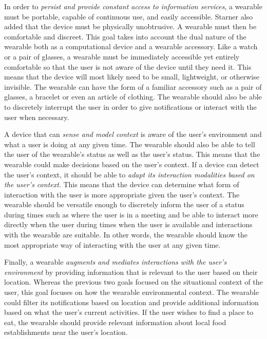 \documentclass[11pt]{article}
\begin{document}
In order to \textit{persist and provide constant access to information services}, a wearable must be portable, capable of continuous use, and easily accessible. Starner also added that the device must be physically unobtrusive. A wearable must then be comfortable and discreet. This goal takes into account the dual nature of the wearable both as a computational device and a wearable accessory. Like a watch or a pair of glasses, a wearable must be immediately accessible yet entirely comfortable so that the user is not aware of the device until they need it.  This means that the device will most likely need to be small, lightweight, or otherwise invisible. The wearable can have the form of a familiar accessory such as a pair of glasses, a bracelet or even an article of clothing. The wearable should also be able to discretely interrupt the user in order to give notifications or interact with the user when necessary.

A device that can \textit{sense and model context} is aware of the user's environment and what a user is doing at any given time. The wearable should also be able to tell the user of the wearable's status as well as the user's status. This means that the wearable could make decisions based on the user's context. If a device can detect the user's context, it should be able to \textit{adapt its interaction modalities based on the user's context}. This means that the device can determine what form of interaction with the user is more appropriate given the user's context. The wearable should be versatile enough to discretely inform the user of a status during times such as where the user is in a meeting and be able to interact more directly when the user during times when the user is available and interactions with the wearable are suitable. In other words, the wearable should know the most appropriate way of interacting with the user at any given time.

Finally, a wearable \textit{augments and mediates interactions with the user's environment} by providing information that is relevant to the user based on their location. Whereas the previous two goals focused on the situational context of the user, this goal focuses on how the wearable environmental context. The wearable could filter its notifications based on location and provide additional information based on what the user's current activities. If the user wishes to find a place to eat, the wearable should provide relevant information about local food establishments near the user's location. 
\end{document}
